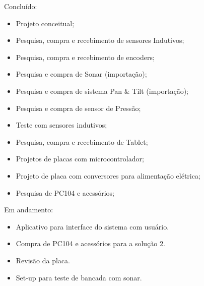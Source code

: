 Concluído:
\begin{itemize}
  \item Projeto conceitual;
  \item Pesquisa, compra e recebimento de sensores Indutivos;
  \item Pesquisa, compra e recebimento de encoders;
  \item Pesquisa e compra de Sonar (importação);
  \item Pesquisa e compra de sistema Pan \& Tilt (importação);
  \item Pesquisa e compra de sensor de Pressão;
  \item Teste com sensores indutivos;
  \item Pesquisa, compra e recebimento de Tablet;
  \item Projetos de placas com microcontrolador;
  \item Projeto de placa com conversores para alimentação elétrica;
  \item Pesquisa de PC104 e acessórios;   
\end{itemize}
Em andamento:
\begin{itemize}
  \item Aplicativo para interface do sistema com usuário.
  \item Compra de PC104 e acessórios para a solução 2.
  \item Revisão da placa.
  \item Set-up para teste de bancada com sonar.
\end{itemize}
